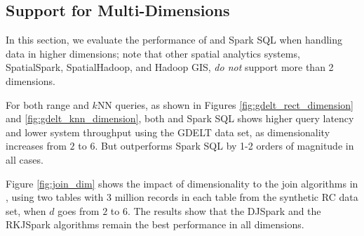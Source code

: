 \subsection{Support for Multi-Dimensions}
\label{sec:mdexp}
In this section, we evaluate the performance of \name and Spark SQL
when handling data in higher dimensions; note that other spatial
analytics systems, SpatialSpark, SpatialHadoop, and Hadoop GIS, {\em
  do not} support more than 2 dimensions.

For both range and $k$NN queries, as shown in Figures
\ref{fig:gdelt_rect_dimension} and \ref{fig:gdelt_knn_dimension}, both \name
and Spark SQL shows higher query latency and lower system throughput
using the GDELT data set, as dimensionality increases from $2$ to $6$.
But \name outperforms Spark SQL by 1-2 orders of magnitude in all cases.



Figure \ref{fig:join_dim} shows the impact of dimensionality to the
join algorithms in \name, using two tables with 3 million records in
each table from the synthetic RC data set, when $d$ goes from $2$ to
$6$. The results show that the DJSpark and the RKJSpark algorithms
remain the best performance in all
dimensions. %



